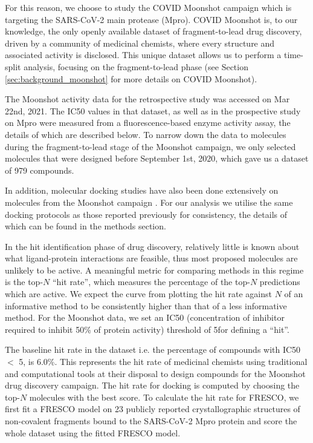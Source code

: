 For this reason, we choose to study the COVID Moonshot campaign \cite{Moonshot2022} which is targeting the SARS-CoV-2 main protease (Mpro). COVID Moonshot is, to our knowledge, the only openly available dataset of fragment-to-lead drug discovery, driven by a community of medicinal chemists, where every structure and associated activity is disclosed. This unique dataset allows us to perform a time-split analysis, focusing on the fragment-to-lead phase (see Section \ref{sec:background_moonshot} for more details on COVID Moonshot).

The Moonshot activity data for the retrospective study was accessed on Mar 22nd, 2021. The IC50 values in that dataset, as well as in the prospective study on Mpro were measured from a fluorescence-based enzyme activity assay, the details of which are described below. To narrow down the data to molecules during the fragment-to-lead stage of the Moonshot campaign, we only selected molecules that were designed before September 1st, 2020, which gave us a dataset of 979 compounds.

In addition, molecular docking studies have also been done extensively on molecules from the Moonshot campaign \cite{Morris2021Rank, Saar2021biorxiv}. For our analysis we utilise the same docking protocols as those reported previously for consistency, the details of which can be found in the methods section.

In the hit identification phase of drug discovery, relatively little is known about what ligand-protein interactions are feasible, thus most proposed molecules are unlikely to be active. A meaningful metric for comparing methods in this regime is the top-$N$ ``hit rate'', which measures the percentage of the top-$N$ predictions which are active. We expect the curve from plotting the hit rate against $N$ of an informative method to be consistently higher than that of a less informative method. For the Moonshot data, we set an IC50 (concentration of inhibitor required to inhibit 50\% of protein activity) threshold of 5\uM for defining a ``hit''.

The baseline hit rate in the dataset i.e. the percentage of compounds with IC50 $<$ 5\uM, is 6.0\%. This represents the hit rate of medicinal chemists using traditional and computational tools at their disposal to design compounds for the Moonshot drug discovery campaign. The hit rate for docking is computed by choosing the top-$N$ molecules with the best score. To calculate the hit rate for FRESCO, we first fit a FRESCO model on 23 publicly reported crystallographic structures of non-covalent fragments bound to the SARS-CoV-2 Mpro protein \cite{Douangamath2020XChem} and score the whole dataset using the fitted FRESCO model.


